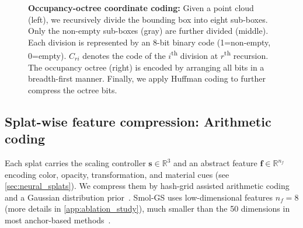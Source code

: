 \documentclass{article}
\def\vf{{\bm{f}}}
\def\vs{{\bm{s}}}
\newcommand{\ours}{Smol-GS\xspace}
\begin{document}
\begin{figure}[t!]
{\begin{minipage}{1.2\textwidth}
  \end{minipage}}
  \vspace{.5em}
  \caption{\textbf{Occupancy-octree coordinate coding:} Given a point cloud (left), we recursively divide the bounding box into eight sub-boxes. Only the non-empty sub-boxes (gray) are further divided (middle). Each division is represented by an 8-bit binary code (1=non-empty, 0=empty). $C_{ri}$ denotes the code of the $i$\textsuperscript{th} division at $r$\textsuperscript{th} recursion. The occupancy octree (right) is encoded by arranging all bits in a breadth-first manner. Finally, we apply Huffman coding to further compress the octree bits.}
  \label{fig:occupancy_octree_encoding}
  \vspace{-1em}
\end{figure}







\subsection{Splat-wise feature compression: Arithmetic coding}
\label{sec:feature-compression}
%
%

Each splat carries the scaling controller $\vs\in\mathbb{R}^3$ and an abstract feature $\vf\in\mathbb{R}^{n_f}$ encoding color, opacity, transformation, and material cues (see \cref{sec:neural_splats}). We compress them by hash-grid assisted arithmetic coding and a Gaussian distribution prior~\cite{chen2024hac}.
\ours uses low-dimensional features $n_f = 8$ (more details in \cref{app:ablation_study}), much smaller than the 50 dimensions in most anchor-based methods~\cite{chen2025hac++, lu2024scaffoldgs}.
\end{document}
